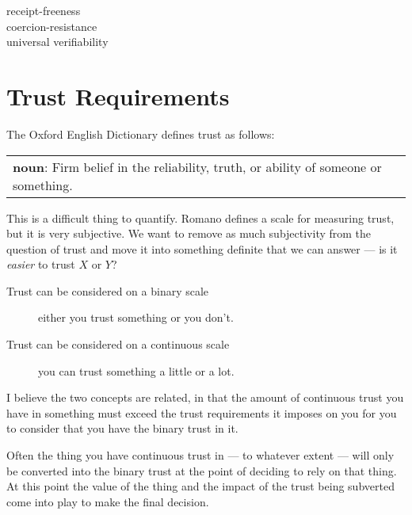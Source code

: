 
\begin{description}
    \item[receipt-freeness]
    \item[coercion-resistance]
    \item[universal verifiability]
    \item[]
\end{description}


\section{Trust Requirements}
\label{ch:req:trust}

The Oxford English Dictionary defines trust as follows:

\vspace{1em}
\noindent \begin{tabular}{|p{}}
    \noindent \textbf{noun}: Firm belief in the reliability, truth, or ability of someone or something.
\end{tabular}
\vspace{1em}

This is a difficult thing to quantify. Romano \cite{romano_nature_2003} defines a scale for measuring trust, but it is very subjective. We want to remove as much subjectivity from the question of trust and move it into something definite that we can answer --- is it \emph{easier} to trust $X$ or $Y$?

\begin{description}
    \item[Trust can be considered on a binary scale] either you trust something or you don't.
    \item[Trust can be considered on a continuous scale] you can trust something a little or a lot.
\end{description}

I believe the two concepts are related, in that the amount of continuous trust you have in something must exceed the trust requirements it imposes on you for you to consider that you have the binary trust in it.

Often the thing you have continuous trust in --- to whatever extent --- will only be converted into the binary trust at the point of deciding to rely on that thing. At this point the value of the thing and the impact of the trust being subverted come into play to make the final decision.

